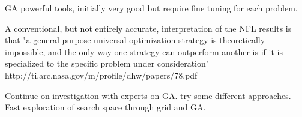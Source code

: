 GA powerful tools, initially very good but require fine tuning for each problem.

A conventional, but not entirely accurate, interpretation of the NFL results is that "a general-purpose universal optimization strategy is theoretically impossible, and the only way one strategy can outperform another is if it is specialized to the specific problem under consideration"
http://ti.arc.nasa.gov/m/profile/dhw/papers/78.pdf

Continue on investigation with experts on GA. try some different approaches. Fast exploration of search space through grid and GA. 






